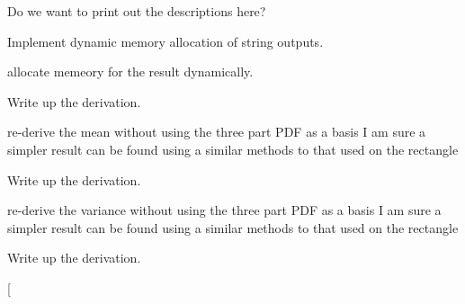 \begin{DoxyRefList}
\item[\label{todo__todo000018}%
\hypertarget{todo__todo000018}{}%
Global \hyperlink{group__api_ga1a1c27d3c46da382a0443f810628a8ac}{Line\-Picking\-Print\-All\-Problems} (void)]Do we want to print out the descriptions here?  
\item[\label{todo__todo000017}%
\hypertarget{todo__todo000017}{}%
Global \hyperlink{group__api_ga146eea4bf38bd6e3812ea47ae2ac57a7}{Line\-Picking\-Problem\-Lookup} (int $\ast$, char $\ast$$\ast$, char $\ast$$\ast$)]Implement dynamic memory allocation of string outputs.  
\item[\label{todo__todo000020}%
\hypertarget{todo__todo000020}{}%
Global \hyperlink{group__api_ga0aec0b2f87903f4bf4ad3011a99b3446}{Line\-Picking\-Support} (double $\ast$, int $\ast$, double $\ast$, int $\ast$, int $\ast$, char $\ast$$\ast$)]allocate memeory for the result dynamically.  
\item[\label{todo__todo000024}%
\hypertarget{todo__todo000024}{}%
Global \hyperlink{_prism_geodesic_8h_a8fb219075b27e66757a3b5c234097c4d}{Prism\-Geodesic\-Distance\-C\-D\-F} (double t, double $\ast$parameters)]Write up the derivation.  
\item[\label{todo__todo000025}%
\hypertarget{todo__todo000025}{}%
Global \hyperlink{_prism_geodesic_8h_a8ac24433806e383dec481431b92b4606}{Prism\-Geodesic\-Distance\-Mean} (double $\ast$parameters)]re-\/derive the mean without using the three part P\-D\-F as a basis I am sure a simpler result can be found using a similar methods to that used on the rectangle  
\item[\label{todo__todo000023}%
\hypertarget{todo__todo000023}{}%
Global \hyperlink{_prism_geodesic_8h_a674a98341a80a5b8589352280f89173c}{Prism\-Geodesic\-Distance\-P\-D\-F} (double t, double $\ast$parameters)]Write up the derivation.  
\item[\label{todo__todo000026}%
\hypertarget{todo__todo000026}{}%
Global \hyperlink{_prism_geodesic_8h_ac804282eeada51c4b8b2e2ae636d1bab}{Prism\-Geodesic\-Distance\-Var} (double $\ast$parameters)]re-\/derive the variance without using the three part P\-D\-F as a basis I am sure a simpler result can be found using a similar methods to that used on the rectangle  
\item[\label{todo__todo000027}%
\hypertarget{todo__todo000027}{}%
Global \hyperlink{_rectangle_8h_a1efe7711b068562816ebbe0af282f20b}{Rectangle\-Distance\-C\-D\-F} (double t, double $\ast$parameters)]Write up the derivation.  
\item[\label{todo__todo000029}%
$$
\end{DoxyRefList}
